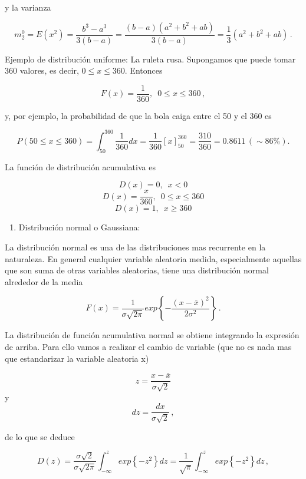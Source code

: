 \documentclass[
]{agujournal2019}
\providecommand{\tightlist}{%
  \setlength{\itemsep}{0pt}\setlength{\parskip}{0pt}}\usepackage{longtable,booktabs,array}
\begin{document}
y la varianza

\[m^0_2=E(x^2)=\frac{b^3-a^3}{3(b-a)}=\frac{(b-a)(a^2+b^2+ab)}{3(b-a)}=\frac{1}{3}(a^2 + b^2 +ab)\,.\]

Ejemplo de distribución uniforme: La ruleta rusa. Supongamos que puede
tomar 360 valores, es decir, \(0 \le x \le 360\). Entonces

\[F(x)=\frac{1}{360},\,\,\,0 \le x \le 360\,,\]

y, por ejemplo, la probabilidad de que la bola caiga entre el 50 y el
360 es

\[P(50\le x \le 360)=\int^{360}_{50}\frac{1}{360}dx=\frac{1}{360}\left[x\right]^{360}_{50}=\frac{310}{360}=0.8611\,(\sim86\%).\]

La función de distribución acumulativa es

\[D(x)=0,\,\,\,x<0\] \[D(x)=\frac{x}{360},\,\,\,0 \le x \le 360\]
\[D(x)=1,\,\,\,x \ge 360\]

\vspace{0.5cm}

\begin{enumerate}
\def\labelenumi{\arabic{enumi}.}
\setcounter{enumi}{1}
\tightlist
\item
  Distribución normal o Gaussiana:\\
\end{enumerate}

La distribución normal es una de las distribuciones mas recurrente en la
naturaleza. En general cualquier variable aleatoria medida,
especialmente aquellas que son suma de otras variables aleatorias, tiene
una distribución normal alrededor de la media

\[F(x)=\frac{1}{\sigma\sqrt{2\pi}}{exp}
   \left\{ -\frac{(x-\bar{x})^2}{2\sigma^2} \right\}\,.\]

\begin{center}
\end{center}

La distribución de función acumulativa normal se obtiene integrando la
expresión de arriba. Para ello vamos a realizar el cambio de variable
(que no es nada mas que estandarizar la variable aleatoria x)

\[z=\frac{x-\bar{x}}{\sigma\sqrt{2}}\] y
\[dz=\frac{dx}{\sigma\sqrt{2}}\,,\]

de lo que se deduce

\[D(z)=\frac{\sigma\sqrt{2}}{\sigma\sqrt{2\pi}}\int^z_{-\infty} {exp}
  \left\{ -z^2 \right\}dz =
  \frac{1}{\sqrt{\pi}}\int^z_{-\infty} {exp}
  \left\{ -z^2 \right\} dz\,,\]
\end{document}

